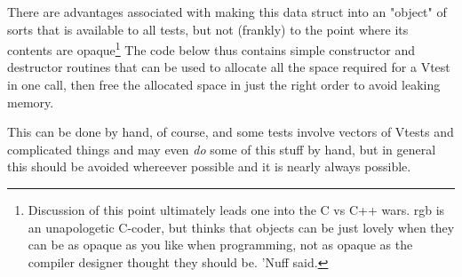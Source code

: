 \documentclass[12pt]{article}
\begin{document}
There are advantages associated with making this data struct into an
"object" of sorts that is available to all tests, but not (frankly) to
the point where its contents are opaque\footnote{Discussion of this
point ultimately leads one into the C vs C++ wars.  rgb is an
unapologetic C-coder, but thinks that objects can be just lovely when
they can be as opaque as you like when programming, not as opaque as the
compiler designer thought they should be.  'Nuff said.} The code below
thus contains simple constructor and destructor routines that can be
used to allocate all the space required for a Vtest in one call, then
free the allocated space in just the right order to avoid leaking
memory.  

This can be done by hand, of course, and some tests involve vectors of
Vtests and complicated things and may even {\em do} some of this stuff
by hand, but in general this should be avoided whereever possible and it
is nearly always possible.
\end{document}
